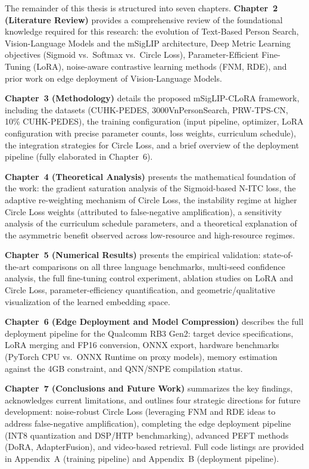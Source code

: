 \documentclass[../main.tex]{subfiles}
\begin{document}
The remainder of this thesis is structured into seven chapters. \textbf{Chapter~2 (Literature Review)} provides a comprehensive review of the foundational knowledge required for this research: the evolution of Text-Based Person Search, Vision-Language Models and the mSigLIP architecture, Deep Metric Learning objectives (Sigmoid vs.\ Softmax vs.\ Circle Loss), Parameter-Efficient Fine-Tuning (LoRA), noise-aware contrastive learning methods (FNM, RDE), and prior work on edge deployment of Vision-Language Models.

\textbf{Chapter~3 (Methodology)} details the proposed mSigLIP-CLoRA framework, including the datasets (CUHK-PEDES, 3000VnPersonSearch, PRW-TPS-CN, 10\% CUHK-PEDES), the training configuration (input pipeline, optimizer, LoRA configuration with precise parameter counts, loss weights, curriculum schedule), the integration strategies for Circle Loss, and a brief overview of the deployment pipeline (fully elaborated in Chapter~6).

\textbf{Chapter~4 (Theoretical Analysis)} presents the mathematical foundation of the work: the gradient saturation analysis of the Sigmoid-based N-ITC loss, the adaptive re-weighting mechanism of Circle Loss, the instability regime at higher Circle Loss weights (attributed to false-negative amplification), a sensitivity analysis of the curriculum schedule parameters, and a theoretical explanation of the asymmetric benefit observed across low-resource and high-resource regimes.

\textbf{Chapter~5 (Numerical Results)} presents the empirical validation: state-of-the-art comparisons on all three language benchmarks, multi-seed confidence analysis, the full fine-tuning control experiment, ablation studies on LoRA and Circle Loss, parameter-efficiency quantification, and geometric/qualitative visualization of the learned embedding space.

\textbf{Chapter~6 (Edge Deployment and Model Compression)} describes the full deployment pipeline for the Qualcomm RB3 Gen2: target device specifications, LoRA merging and FP16 conversion, ONNX export, hardware benchmarks (PyTorch CPU vs.\ ONNX Runtime on proxy models), memory estimation against the 4GB constraint, and QNN/SNPE compilation status.

\textbf{Chapter~7 (Conclusions and Future Work)} summarizes the key findings, acknowledges current limitations, and outlines four strategic directions for future development: noise-robust Circle Loss (leveraging FNM and RDE ideas to address false-negative amplification), completing the edge deployment pipeline (INT8 quantization and DSP/HTP benchmarking), advanced PEFT methods (DoRA, AdapterFusion), and video-based retrieval. Full code listings are provided in Appendix~A (training pipeline) and Appendix~B (deployment pipeline).
\end{document}
